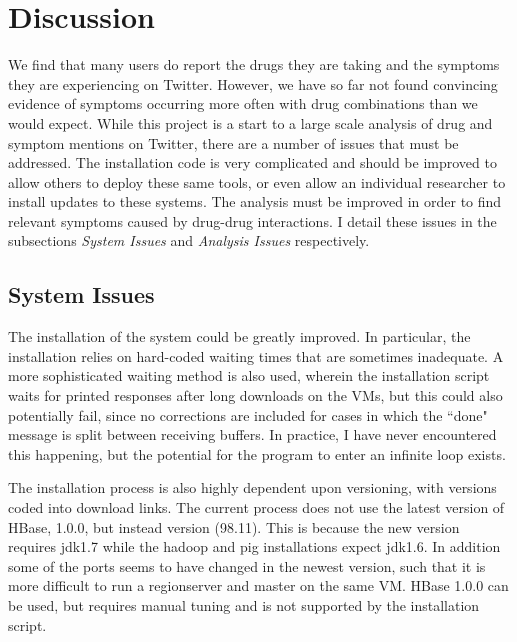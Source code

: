 \documentclass[letterpaper]{article}
\begin{document}
\section{Discussion}

We find that many users do report the drugs they are taking and the symptoms they are experiencing on Twitter. However, we have so far not found convincing evidence of symptoms occurring more often with drug combinations than we would expect. While this project is a start to a large scale analysis of drug and symptom mentions on Twitter, there are a number of issues that must be addressed. The installation code is very complicated and should be improved to allow others to deploy these same tools, or even allow an individual researcher to install updates to these systems. The analysis must be improved in order to find relevant symptoms caused by drug-drug interactions. I detail these issues in the subsections \textit{System Issues} and \textit{Analysis Issues} respectively.

\subsection{System Issues}
The installation of the system could be greatly improved. In particular, the installation relies on hard-coded waiting times that are sometimes inadequate. A more sophisticated waiting method is also used, wherein the installation script waits for printed responses after long downloads on the VMs, but this could also potentially fail, since no corrections are included for cases in which the ``done" message is split between receiving buffers. In practice, I have never encountered this happening, but the potential for the program to enter an infinite loop exists.

The installation process is also highly dependent upon versioning, with versions coded into download links. The current process does not use the latest version of HBase, 1.0.0, but instead version (98.11). This is because the new version requires jdk1.7 while the hadoop and pig installations expect jdk1.6. In addition some of the ports seems to have changed in the newest version, such that it is more difficult to run a regionserver and master on the same VM. HBase 1.0.0 can be used, but requires manual tuning and is not supported by the installation script. 
\end{document}
